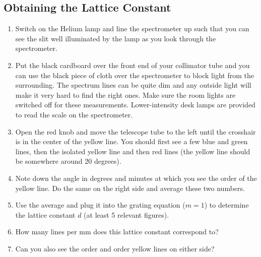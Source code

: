 \subsection{Obtaining the Lattice Constant}
\begin{enumerate}
\item Switch on the Helium lamp and line the spectrometer up such that you can see the slit well illuminated by the lamp as you look through the spectrometer.

\item Put the black cardboard over the front end of your collimator tube and you can use the black piece of cloth over the spectrometer to block light from the surrounding. The spectrum lines can be quite dim and any outside light will make it very hard to find the right ones. Make sure the room lights are switched off for these measurements. Lower-intensity desk lamps are provided to read the scale on the spectrometer.

\item Open the red knob and move the telescope tube to the left until the crosshair is in the center of the yellow line. You should first see a few blue and green lines, then the isolated yellow line and then red lines (the yellow line should be somewhere around 20 degrees).

\item Note down the angle in degrees and minutes at which you see the  order of the yellow line. Do the same on the right side and average these two numbers.

\item Use the average and plug it into the grating equation ($m=1$) to determine the lattice constant $d$ (at least 5 relevant figures).

\item How many lines per mm does this lattice constant correspond to?

\item Can you also see the  order and  order yellow lines on either side?
\end{enumerate}

